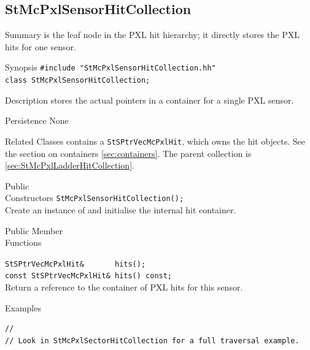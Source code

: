 \subsection{StMcPxlSensorHitCollection}
 
\label{sec:StMcPxlSensorHitCollection}
\begin{Entry}
\item[Summary]
     is the leaf node in the PXL hit
    hierarchy; it directly stores the PXL hits for one sensor.

\item[Synopsis]
    \verb+#include "StMcPxlSensorHitCollection.hh"+\\
    \verb+class StMcPxlSensorHitCollection;+\\

\item[Description]
     stores the actual
     pointers in a  container
    for a single PXL sensor.

\item[Persistence]
    None

\item[Related Classes]
     contains a
    {\tt StSPtrVecMcPxlHit}, which owns the hit objects.  See the
    section on containers \ref{sec:containers}.
    The parent collection is
     \ref{sec:StMcPxlLadderHitCollection}.

\item[Public\\ Constructors]
    \verb+StMcPxlSensorHitCollection();+\\
    Create an instance of  and
    initialise the internal hit container.

\item[Public Member\\ Functions]

    \verb+StSPtrVecMcPxlHit&       hits();+\\
    \verb+const StSPtrVecMcPxlHit& hits() const;+\\
    Return a reference to the container of PXL hits for this sensor.

\item[Examples]
{\footnotesize
\begin{verbatim}
//
// Look in StMcPxlSectorHitCollection for a full traversal example.
\end{verbatim}
}%
\end{Entry}
\clearpage

